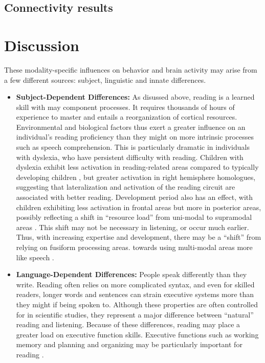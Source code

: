\subsection{Connectivity results}


\section{Discussion}



These modality-specific influences on behavior and brain activity may arise from a few different sources: subject, linguistic and innate differences. 

\begin{itemize}
	\item \textbf{Subject-Dependent Differences:} As disussed above, reading is a learned skill with may component processes. It requires thousands of hours of experience to master and entails a reorganization of cortical resources. Environmental and biological factors thus exert a greater influence on an individual’s reading proficiency than they might on more intrinsic processes such as speech comprehension. This is particularly dramatic in individuals with dyslexia, who have persistent difficulty with reading. Children with dyslexia exhibit less activation in reading-related areas compared to typically developing children \cite{Pugh2000}, but greater activation in right hemisphere homologues, suggesting that lateralization and activation of the reading circuit are associated with better reading. Development period also has an effect, with children exhibiting less activation in frontal areas but more in posterior areas, possibly reflecting a shift in “resource load” from uni-modal to supramodal areas \cite{Berl2010}. This shift may not be necessary in listening, or occur much earlier. Thus, with increasing expertise and development, there may be a “shift” from relying on fusiform processing areas. towards using multi-modal areas more like speech \cite{Monzalvo}. 

	\item \textbf{Language-Dependent Differences:} People speak differently than they write. Reading often relies on more complicated syntax, and even for skilled readers, longer words and sentences can strain executive systems more than they might if being spoken to. Although these properties are often controlled for in scientific studies, they represent a major difference between “natural” reading and listening. Because of these differences, reading may place a greater load on executive function skills. Executive functions such as working memory and planning and organizing may be particularly important for reading \cite{Cain}.  
	

\end{itemize}
